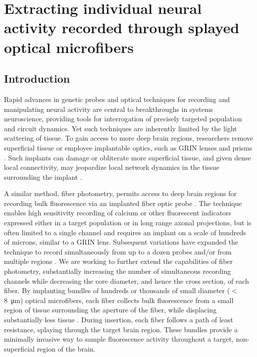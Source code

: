 \chapter{Extracting individual neural activity recorded through splayed optical microfibers}

\label{chapter:modeling}
\thispagestyle{myheadings}

\graphicspath{{4_Modeling/Figures/}}


\section{Introduction}

Rapid advances in genetic probes \cite{Emiliani:2015jl} and optical techniques for recording and manipulating neural activity \cite{Deisseroth:2006dd} are central to breakthroughs in systems neuroscience, providing tools for interrogation of precisely targeted population and circuit dynamics. Yet such techniques are inherently limited by the light scattering of tissue. To gain access to more deep brain regions, researchers remove superficial tissue \cite{Dombeck:2010jr} or employee implantable optics, such as GRIN lenses and prisms \cite{Jung:2004kv,Barretto:2009hk,Andermann:2013kc}. Such implants can damage or obliterate more superficial tissue, and given dense local connectivity, may jeopardize local network dynamics in the tissue surrounding the implant \cite{Hayn:2015ew,Hayn:2017kj,GossVarley:2017kf}.

A similar method, fiber photometry, permits access to deep brain regions for recording bulk fluorescence via an implanted fiber optic probe \cite{Adelsberger:2005dy,Cui:2013dq,Adelsberger:2014jd,Gunaydin:2014dh}. The technique enables high sensitivity recording of calcium or other fluorescent indicators expressed either in a target population or in long range axonal projections, but is often limited to a single channel and requires an implant on a scale of hundreds of microns, similar to a GRIN lens. Subsequent variations have expanded the technique to record simultaneously from up to a dozen probes and/or from multiple regions \cite{Guo:2015gu}. We are working to further extend the capabilities of fiber photometry, substantially increasing the number of simultaneous recording channels while decreasing the core diameter, and hence the cross section, of each fiber. By implanting bundles of hundreds or thousands of small diameter ($<$8~\si{\micro\meter}) optical microfibers, each fiber collects bulk fluorescence from a small region of tissue surrounding the aperture of the fiber, while displacing substantially less tissue \cite{Perkins:2018ae}. During insertion, each fiber follows a path of least resistance, splaying through the target brain region. These bundles provide a minimally invasive way to sample fluorescence activity throughout a target, non-superficial region of the brain.

